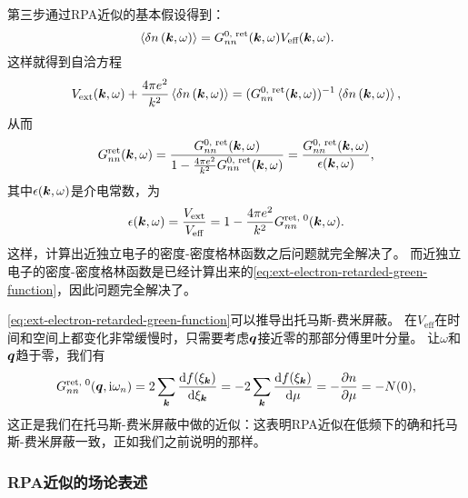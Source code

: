 第三步通过RPA近似的基本假设得到：
\begin{equation}
    \expval*{\var{{n}}(\vb*{k}, \omega)} = G^\text{0, ret}_{nn} (\vb*{k}, \omega) V_\text{eff} (\vb*{k}, \omega).
    \label{eq:rpa-approximation}
\end{equation}
这样就得到自洽方程
\[
    V_\text{ext}(\vb*{k}, \omega) + \frac{4\pi e^2}{k^2} \expval*{\var{{n}}(\vb*{k}, \omega)} = (G^\text{0, ret}_{nn} (\vb*{k}, \omega))^{-1} \expval*{\var{{n}}(\vb*{k}, \omega)},
\]
从而
\begin{equation}
    G^\text{ret}_{nn}(\vb*{k}, \omega) = \frac{G^\text{0, ret}_{nn}(\vb*{k}, \omega)}{1 - \frac{4\pi e^2}{k^2} G^\text{0, ret}_{nn}(\vb*{k}, \omega)} = \frac{G^\text{0, ret}_{nn}(\vb*{k}, \omega)}{\epsilon(\vb*{k}, \omega)},
    \label{eq:ext-electron-ret-nn}
\end{equation}
其中$\epsilon(\vb*{k}, \omega)$是介电常数，为
\begin{equation}
    \epsilon(\vb*{k}, \omega) = \frac{V_\text{ext}}{V_\text{eff}} = 1 - \frac{4 \pi e^2}{k^2} G^\text{ret, 0}_{nn}(\vb*{k}, \omega).
\end{equation}
这样，计算出近独立电子的密度-密度格林函数之后问题就完全解决了。
而近独立电子的密度-密度格林函数是已经计算出来的\eqref{eq:ext-electron-retarded-green-function}，因此问题完全解决了。

\eqref{eq:ext-electron-retarded-green-function}可以推导出托马斯-费米屏蔽。
在$V_\text{eff}$在时间和空间上都变化非常缓慢时，只需要考虑$\vb*{q}$接近零的那部分傅里叶分量。
让$\omega$和$\vb*{q}$趋于零，我们有
\begin{equation}
    G_{nn}^\text{ret, 0}(\vb*{q}, \mathrm{i} \omega_n) = 2 \sum_{\vb*{k}} \dv{f(\xi_{\vb*{k}})}{\xi_{\vb*{k}}} = - 2 \sum_{\vb*{k}} \dv{f(\xi_{\vb*{k}})}{\mu} = - \pdv{n}{\mu} = - N(0),
    \label{eq:back-to-thomas-fermi}
\end{equation}
这正是我们在托马斯-费米屏蔽中做的近似：这表明RPA近似在低频下的确和托马斯-费米屏蔽一致，正如我们之前说明的那样。

\subsubsection{RPA近似的场论表述}\label{sec:rpa-field-theory}

